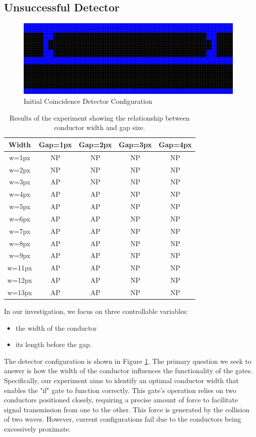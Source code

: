 \subsection{Unsuccessful Detector}\label{unsuccessful-detector}
\begin{figure}
    \centering
    \includegraphics[width=0.75\linewidth]{image7.png}
    \caption{Initial Coincidence Detector Configuration}
    \label{fig:unsuccessful-config-and-gate}
\end{figure}
\begin{table}[h]
\centering
\begin{tabular}{|c|c|c|c|c|}
\hline
Width & Gap=1px & Gap=2px & Gap=3px & Gap=4px \\ \hline
w=1px & NP & NP & NP & NP \\ \hline
w=2px & NP & NP & NP & NP \\ \hline
w=3px & AP & NP & NP & NP \\ \hline
w=4px & AP & AP & NP & NP \\ \hline
w=5px & AP & AP & NP & NP \\ \hline
w=6px & AP & AP & NP & NP \\ \hline
w=7px & AP & AP & NP & NP \\ \hline
w=8px & AP & AP & NP & NP \\ \hline
w=9px & AP & AP & NP & NP \\ \hline
w=11px & AP & AP & NP & NP \\ \hline
w=12px & AP & AP & NP & NP \\ \hline
w=13px & AP & AP & NP & NP \\ \hline
\end{tabular}
\caption{Results of the experiment showing the relationship between conductor width and gap size.}
\label{table:experiment-results}
\end{table}
In our investigation, we focus on three controllable variables: 
\begin{itemize}
    \item the width of the conductor
    \item its length before the gap.
\end{itemize}
The detector configuration is shown in Figure \ref{fig:unsuccessful-config-and-gate}.
The primary question we seek to answer is how the width of the conductor influences the functionality of the gates. Specifically, our experiment aims to identify an optimal conductor width that enables the "if" gate to function correctly. This gate's operation relies on two conductors positioned closely, requiring a precise amount of force to facilitate signal transmission from one to the other. This force is generated by the collision of two waves. However, current configurations fail due to the conductors being excessively proximate.

